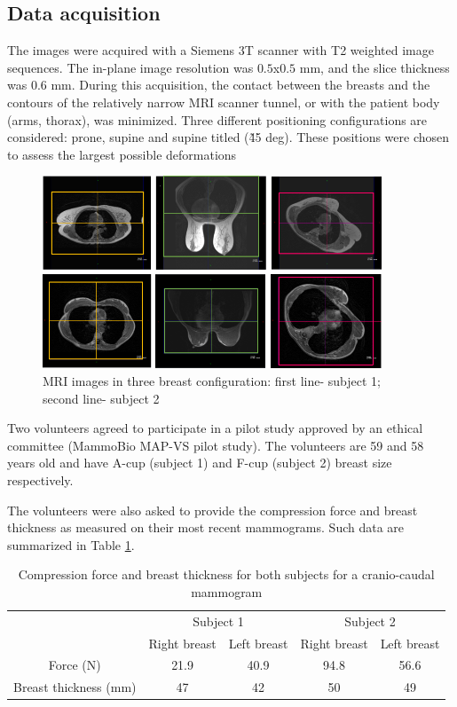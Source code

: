 \subsection{Data acquisition}%

 The images were acquired with a Siemens 3T scanner with T2 weighted image sequences. The in-plane image resolution was $0.5$x$0.5$ mm, and the slice thickness was 0.6 mm. During this acquisition, the contact between the breasts and the contours of the  relatively narrow MRI scanner tunnel, or with the patient body (arms, thorax), was minimized. Three different positioning configurations are considered: prone, supine and supine titled (\~ 45 deg). These positions were chosen to assess the largest possible deformations
\begin{figure}[H]
\centering
\includegraphics[width=0.9\textwidth,keepaspectratio]{figures/patientData.png} 
\caption{MRI images in three breast configuration: first line- subject 1; second line- subject 2}\label{fig:patientdata}
\end{figure}

Two volunteers agreed to participate in a pilot study approved by an ethical committee (MammoBio MAP-VS pilot study). The volunteers are 59 and 58 years old and have A-cup (subject 1) and F-cup (subject 2) breast size respectively. 
 

The volunteers were also asked to provide the compression force and breast thickness as measured on their most recent mammograms. Such data are summarized in Table \ref{tab:forceandthichnessdata}.
\begin{table}[H]
\centering
\begin{tabular}{c|c|c||c|c|}
\cline{2-5}
&\multicolumn{2}{c||}{Subject 1}&\multicolumn{2}{c|}{Subject 2}\\
\cline{2-5}
& Right breast & Left breast & Right breast & Left breast\\
\cline{2-5}
\hline
\multicolumn{1}{|c||}{Force (N)}  & 21.9 &40.9 &94.8 & 56.6 \\
\hline
\multicolumn{1}{|c||}{ Breast thickness (mm)} & 47 & 42 & 50 & 49 \\
\hline

\end{tabular}
\caption{Compression force and breast thickness for both subjects for a cranio-caudal mammogram}\label{tab:forceandthichnessdata}
\end{table}

